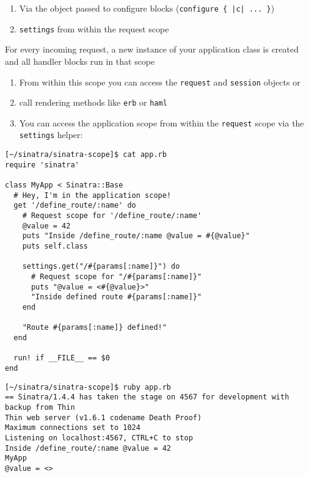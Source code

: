 \begin{enumerate}
\item 
Via the object passed to configure blocks (\verb:configure { |c| ... }:)
\item 
\verb|settings| from within the request scope
\end{enumerate}


For every incoming request, a new instance of your application class is created and all handler blocks run in that scope
\begin{enumerate}
\item  From within this scope you can access the \verb|request| and \verb|session| objects or 
\item 
call rendering methods like \verb|erb| or \verb|haml|
\item  You can access the application scope from within the \verb|request| scope via the \verb|settings| helper:
\end{enumerate}

\begin{verbatim}
[~/sinatra/sinatra-scope]$ cat app.rb 
require 'sinatra'

class MyApp < Sinatra::Base
  # Hey, I'm in the application scope!
  get '/define_route/:name' do
    # Request scope for '/define_route/:name'
    @value = 42
    puts "Inside /define_route/:name @value = #{@value}"
    puts self.class

    settings.get("/#{params[:name]}") do
      # Request scope for "/#{params[:name]}"
      puts "@value = <#{@value}>"
      "Inside defined route #{params[:name]}"
    end

    "Route #{params[:name]} defined!"
  end
  
  run! if __FILE__ == $0
end
\end{verbatim}

\begin{verbatim}
[~/sinatra/sinatra-scope]$ ruby app.rb 
== Sinatra/1.4.4 has taken the stage on 4567 for development with backup from Thin
Thin web server (v1.6.1 codename Death Proof)
Maximum connections set to 1024
Listening on localhost:4567, CTRL+C to stop
Inside /define_route/:name @value = 42
MyApp
@value = <>

\end{verbatim}

